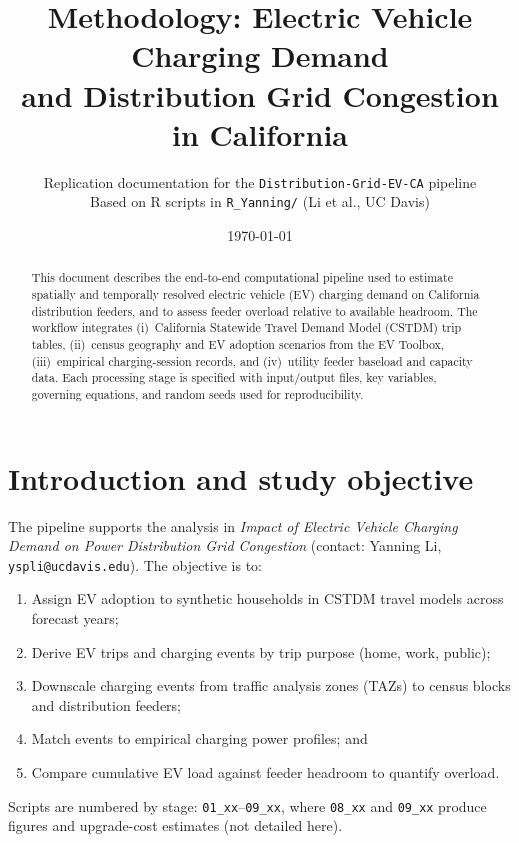 \documentclass[11pt,a4paper]{article}
\title{Methodology: Electric Vehicle Charging Demand\\
and Distribution Grid Congestion in California}
\author{Replication documentation for the \texttt{Distribution-Grid-EV-CA} pipeline\\
\small Based on R scripts in \texttt{R\_Yanning/} (Li et al., UC Davis)}
\date{\today}
\begin{document}
\maketitle

\begin{abstract}
This document describes the end-to-end computational pipeline used to estimate spatially and temporally resolved electric vehicle (EV) charging demand on California distribution feeders, and to assess feeder overload relative to available headroom. The workflow integrates (i)~California Statewide Travel Demand Model (CSTDM) trip tables, (ii)~census geography and EV adoption scenarios from the EV Toolbox, (iii)~empirical charging-session records, and (iv)~utility feeder baseload and capacity data. Each processing stage is specified with input/output files, key variables, governing equations, and random seeds used for reproducibility.
\end{abstract}

\tableofcontents
\newpage

\section{Introduction and study objective}

The pipeline supports the analysis in \emph{Impact of Electric Vehicle Charging Demand on Power Distribution Grid Congestion} (contact: Yanning Li, \texttt{yspli@ucdavis.edu}). The objective is to:

\begin{enumerate}[noitemsep]
  \item Assign EV adoption to synthetic households in CSTDM travel models across forecast years;
  \item Derive EV trips and charging events by trip purpose (home, work, public);
  \item Downscale charging events from traffic analysis zones (TAZs) to census blocks and distribution feeders;
  \item Match events to empirical charging power profiles; and
  \item Compare cumulative EV load against feeder headroom to quantify overload.
\end{enumerate}

Scripts are numbered by stage: \texttt{01\_xx}--\texttt{09\_xx}, where \texttt{08\_xx} and \texttt{09\_xx} produce figures and upgrade-cost estimates (not detailed here).
\end{document}
